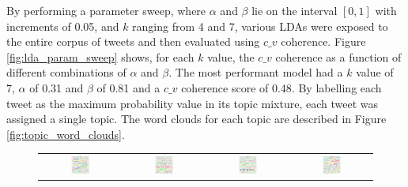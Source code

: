 By performing a parameter sweep, where $\alpha$ and $\beta$ lie on the interval
$[0, 1]$ with increments of 0.05, and $k$ ranging from 4 and 7, various LDAs
were exposed to the entire corpus of tweets and then evaluated using $c\_v$
coherence. Figure \ref{fig:lda_param_sweep} shows, for each $k$ value, the
$c\_v$ coherence as a function of different combinations of $\alpha$ and
$\beta$. The most performant model had a $k$ value of 7, $\alpha$ of 0.31 and
$\beta$ of 0.81 and a $c\_v$ coherence score of 0.48. By labelling each tweet as
the maximum probability value in its topic mixture, each tweet was assigned a
single topic. The word clouds for each topic are described in Figure
\ref{fig:topic_word_clouds}.

\begin{figure}[h!]
    \centering
    \begin{tabular}{cccc}
    \includegraphics[width=0.25\textwidth]{Figures/topic_1_wordcloud} &
    \includegraphics[width=0.25\textwidth]{Figures/topic_2_wordcloud} &
    \includegraphics[width=0.25\textwidth]{Figures/topic_3_wordcloud} &
    \includegraphics[width=0.25\textwidth]{Figures/topic_4_wordcloud} \\

\end{tabular}
\end{figure}

